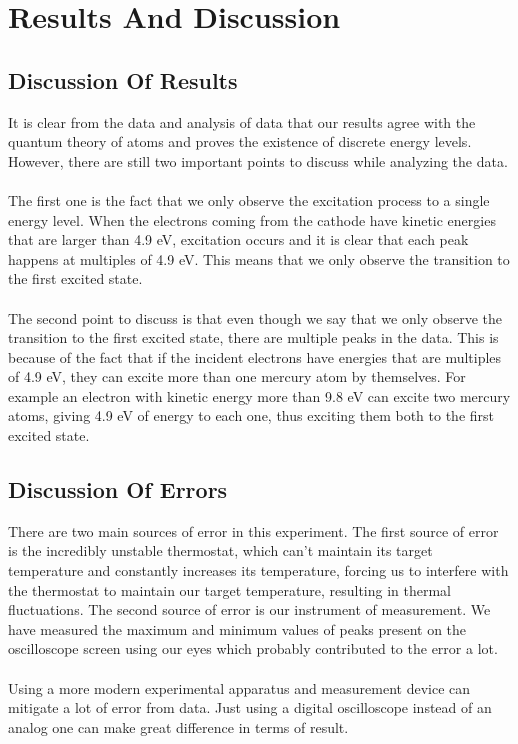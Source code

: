 \section{Results And Discussion}

	\subsection{Discussion Of Results}
		It is clear from the data and analysis of data that our results agree with the quantum theory of atoms and proves the existence of discrete energy levels. However, there are still two important points to discuss while analyzing the data.
		\\
		\\
		The first one is the fact that we only observe the excitation process to a single energy level. When the electrons coming from the cathode have kinetic energies that are larger than 4.9 eV, excitation occurs and it is clear that each peak happens at multiples of 4.9 eV. This means that we only observe the transition to the first excited state. 
		\\
		\\
		The second point to discuss is that even though we say that we only observe the transition to the first excited state, there are multiple peaks in the data. This is because of the fact that if the incident electrons have energies that are multiples of 4.9 eV, they can excite more than one mercury atom by themselves. For example an electron with kinetic energy more than 9.8 eV can excite two mercury atoms, giving 4.9 eV of energy to each one, thus exciting them both to the first excited state.  
	
	\subsection{Discussion Of Errors}
		There are two main sources of error in this experiment. The first source of error is the incredibly unstable thermostat, which can't maintain its target temperature and constantly increases its temperature, forcing us to interfere with the thermostat to maintain our target temperature, resulting in thermal fluctuations. The second source of error is our instrument of  measurement. We have measured the maximum and minimum values of peaks present on the oscilloscope screen using our eyes which probably contributed to the error a lot.
		\\
		\\
		Using a more modern experimental apparatus and measurement device can mitigate a lot of error from data. Just using a digital oscilloscope instead of an analog one can make great difference in terms of result. 